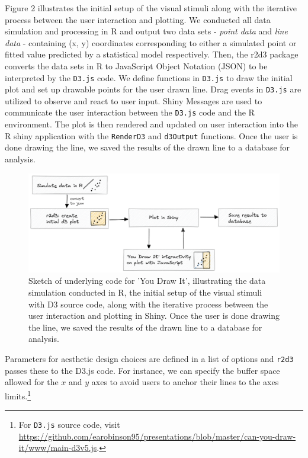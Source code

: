 \documentclass[10pt]{article}
\begin{document}
Figure 2 illustrates the initial setup of the visual stimuli along with
the iterative process between the user interaction and plotting. We
conducted all data simulation and processing in R and output two data
sets - \emph{point data} and \emph{line data} - containing (x, y)
coordinates corresponding to either a simulated point or fitted value
predicted by a statistical model respectively. Then, the r2d3 package
converts the data sets in R to JavaScript Object Notation (JSON) to be
interpreted by the \texttt{D3.js} code. We define functions in
\texttt{D3.js} to draw the initial plot and set up drawable points for
the user drawn line. Drag events in \texttt{D3.js} are utilized to
observe and react to user input. Shiny Messages are used to communicate
the user interaction between the \texttt{D3.js} code and the R
environment. The plot is then rendered and updated on user interaction
into the R shiny application with the \texttt{RenderD3} and
\texttt{d3Output} functions. Once the user is done drawing the line, we
saved the results of the drawn line to a database for analysis.

\begin{figure}[ht]
\begin{center}
\centerline{\includegraphics[width=\columnwidth]{images/code-sketch-2}}
\caption{Sketch of underlying code for 'You Draw It', illustrating the data simulation conducted in R, the initial setup of the visual stimuli with D3 source code, along with the iterative process between the user interaction and plotting in Shiny. Once the user is done drawing the line, we saved the results of the drawn line to a database for analysis.}
\label{you-draw-it-code-sketch}
\end{center}
\end{figure}

Parameters for aesthetic design choices are defined in a list of options
and \texttt{r2d3} passes these to the D3.js code. For instance, we can
specify the buffer space allowed for the \(x\) and \(y\) axes to avoid
users to anchor their lines to the axes limits.\footnote{For
  \texttt{D3.js} source code, visit
  \url{https://github.com/earobinson95/presentations/blob/master/can-you-draw-it/www/main-d3v5.js}.}
\end{document}

